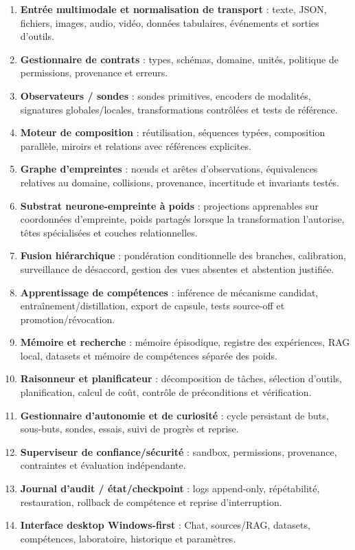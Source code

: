 \documentclass[11pt,a4paper]{report}
\begin{document}
\begin{enumerate}[leftmargin=1.6em]
\item \textbf{Entrée multimodale et normalisation de transport} : texte, JSON, fichiers, images, audio, vidéo, données tabulaires, événements et sorties d'outils.
\item \textbf{Gestionnaire de contrats} : types, schémas, domaine, unités, politique de permissions, provenance et erreurs.
\item \textbf{Observateurs / sondes} : sondes primitives, encoders de modalités, signatures globales/locales, transformations contrôlées et tests de référence.
\item \textbf{Moteur de composition} : réutilisation, séquences typées, composition parallèle, miroirs et relations avec références explicites.
\item \textbf{Graphe d'empreintes} : nœuds et arêtes d'observations, équivalences relatives au domaine, collisions, provenance, incertitude et invariants testés.
\item \textbf{Substrat neurone-empreinte à poids} : projections apprenables sur coordonnées d'empreinte, poids partagés lorsque la transformation l'autorise, têtes spécialisées et couches relationnelles.
\item \textbf{Fusion hiérarchique} : pondération conditionnelle des branches, calibration, surveillance de désaccord, gestion des vues absentes et abstention justifiée.
\item \textbf{Apprentissage de compétences} : inférence de mécanisme candidat, entraînement/distillation, export de capsule, tests source-off et promotion/révocation.
\item \textbf{Mémoire et recherche} : mémoire épisodique, registre des expériences, RAG local, datasets et mémoire de compétences séparée des poids.
\item \textbf{Raisonneur et planificateur} : décomposition de tâches, sélection d'outils, planification, calcul de coût, contrôle de préconditions et vérification.
\item \textbf{Gestionnaire d'autonomie et de curiosité} : cycle persistant de buts, sous-buts, sondes, essais, suivi de progrès et reprise.
\item \textbf{Superviseur de confiance/sécurité} : sandbox, permissions, provenance, contraintes et évaluation indépendante.
\item \textbf{Journal d'audit / état/checkpoint} : logs append-only, répétabilité, restauration, rollback de compétence et reprise d'interruption.
\item \textbf{Interface desktop Windows-first} : Chat, sources/RAG, datasets, compétences, laboratoire, historique et paramètres.
\end{enumerate}
\end{document}
